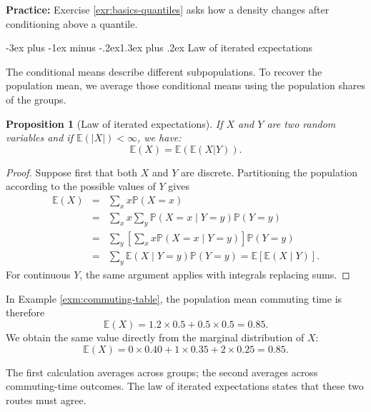 \documentclass[
  11pt,
]{book}
\makeatletter
\renewcommand\section{\@startsection{section}{1}{\z@}
  {-3ex plus -1ex minus -.2ex}{1.3ex plus .2ex}
  {\normalfont\Large\bfseries\color{TextbookInk}}}
\newtheorem{proposition}{Proposition}[chapter]
\theoremstyle{definition}
\theoremstyle{definition}
\theoremstyle{definition}
\theoremstyle{definition}
\theoremstyle{remark}
\makeatother
\begin{document}
\begin{practicebox}
\textbf{Practice:} Exercise \ref{exr:basics-quantiles} asks how a density changes after conditioning above a quantile.

\end{practicebox}

\section{Law of iterated expectations}\label{basics-iterated-expectations}

The conditional means describe different subpopulations. To recover the population mean, we average those conditional means using the population shares of the groups.

\begin{proposition}[Law of iterated expectations]
\protect\hypertarget{prp:lawiteratedexpect}{}\label{prp:lawiteratedexpect}If \(X\) and \(Y\) are two random variables and if \(\mathbb{E}(|X|)<\infty\), we have:
\[
\boxed{\mathbb{E}(X) = \mathbb{E}(\mathbb{E}(X|Y)).}
\]
\end{proposition}

\begin{proof}
Suppose first that both \(X\) and \(Y\) are discrete. Partitioning the population according to the possible values of \(Y\) gives
\begin{eqnarray*}
\mathbb{E}(X)
&=&\sum_x x\mathbb{P}(X=x)\\
&=&\sum_x x\sum_y\mathbb{P}(X=x\mid Y=y)\mathbb{P}(Y=y)\\
&=&\sum_y\left[\sum_x x\mathbb{P}(X=x\mid Y=y)\right]\mathbb{P}(Y=y)\\
&=&\sum_y\mathbb{E}(X\mid Y=y)\mathbb{P}(Y=y)
=\mathbb{E}[\mathbb{E}(X\mid Y)].
\end{eqnarray*}
For continuous \(Y\), the same argument applies with integrals replacing sums.
\end{proof}

In Example \ref{exm:commuting-table}, the population mean commuting time is therefore
\[
\mathbb{E}(X)
=1.2\times 0.5+0.5\times 0.5
=0.85.
\]
We obtain the same value directly from the marginal distribution of \(X\):
\[
\mathbb{E}(X)=0\times0.40+1\times0.35+2\times0.25=0.85.
\]

The first calculation averages across groups; the second averages across commuting-time outcomes. The law of iterated expectations states that these two routes must agree.
\end{document}
